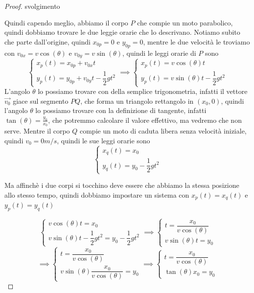 \documentclass{rapport}
\begin{document}
\begin{proof}{svolgimento}
\begin{figure}[!h]
  \end{figure}
    Quindi capendo meglio, abbiamo il corpo $P$ che compie un moto parabolico, quindi dobbiamo trovare le due leggie orarie che lo descrivano. Notiamo subito che parte dall'origine, quindi $x_{0p} = 0$ e $y_{0p} = 0$, mentre le due velocità le troviamo con $v_{0x} = v\cos(\theta)$ e  $v_{0y} = v\sin(\theta)$, quindi le leggi orarie di $P$ sono
    \[
    \begin{cases}
      x_p(t) = x_{0p} + v_{0x} t \\
      y_p(t) = y_{0p} + v_{0y} t - \dfrac{1}{2}gt^2
    \end{cases} \implies
    \begin{cases}
      x_p(t) = v\cos(\theta) t \\
      y_p(t) = v\sin(\theta)t - \dfrac{1}{2}gt^2
    \end{cases} 
    \]
    L'angolo $\theta$ lo possiamo trovare con della semplice trigonometria, infatti il vettore $\vec{v_0}$ giace sul segmento $PQ$, che forma un triangolo rettangolo in $(x_0, 0)$, quindi l'angolo $\theta$ lo possiamo trovare con la definizione di tangente, infatti $\tan(\theta) = \frac{y_0}{x_0}$, che potremmo calcolare il valore effettivo, ma vedremo che non serve. 
    Mentre il corpo $Q$ compie un moto di caduta libera senza velocità iniziale, quindi $v_{0} = 0m/s$, quindi le sue leggi orarie sono 
    \[
    \begin{cases}
      x_q(t) = x_0 \\
      y_q(t) = y_0 - \dfrac{1}{2}gt^2
    \end{cases} 
    \]

    Ma affinchè i due corpi si tocchino deve essere che abbiamo la stessa posizione allo stesso tempo, quindi dobbiamo impostare un sistema con $x_p(t)=x_q(t)$ e $y_p(t)=y_q(t)$

\[
\begin{cases}
 v\cos(\theta) t = x_0 \\
  v\sin(\theta)t - \dfrac{1}{2}gt^2 = y_0 - \dfrac{1}{2}gt^2 
\end{cases} \implies\begin{cases}
 t = \dfrac{x_0}{v\cos(\theta)} \\
  v\sin(\theta)t  = y_0
\end{cases}
\]\[
\implies\begin{cases}
 t = \dfrac{x_0}{v\cos(\theta)} \\[1.2em]
  v\sin(\theta)\dfrac{x_0}{v\cos(\theta)} = y_0
\end{cases}\implies\begin{cases}
 t = \dfrac{x_0}{v\cos(\theta)} \\
  \tan(\theta) x_0= y_0
\end{cases}
\]


\end{proof}
\end{document}
